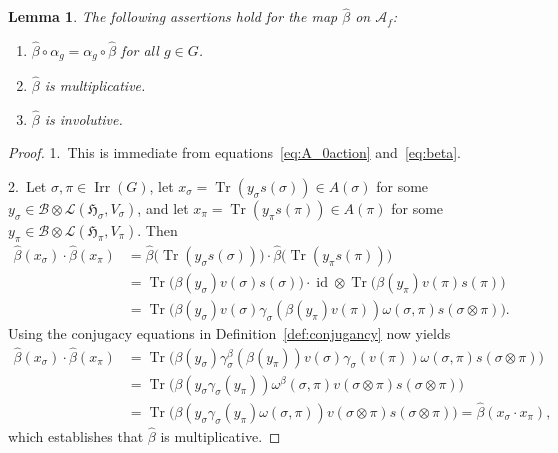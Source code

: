 \documentclass[11pt]{article}
\numberwithin{equation}{section}
\numberwithin{equation}{section}
\newtheorem{Lemma}[Theorem]{Lemma}
\newcommand*{\tensor}{\otimes}		%
\DeclareMathOperator{\id}{id}		%
\DeclareMathOperator{\Tr}{Tr}		%
\newcommand*{\hilb}{\mathfrak}		%
\newcommand*{\alg}{\mathcal}		%
\newcommand*{\hH}{\hilb{H}}			%
\newcommand*{\aA}{\alg{A}}			%
\newcommand*{\aB}{\alg{B}} 			%
\newcommand*{\End}{\mathcal{L}} %
\DeclareMathOperator{\Irrep}{Irr} 			%
\begin{document}
\begin{Lemma}\label{lem:prop_beta}
	The following assertions hold for the map $\hat \beta$ on $\aA_f$:
	\begin{enumerate}\itemsep=0pt
	\item[$1.$]
		$\hat\beta \circ \alpha_g = \alpha_g \circ \hat \beta$ for all $g \in G$.
	\item[$2.$]
		$\hat\beta$ is multiplicative.
	\item[$3.$]
		$\hat\beta$ is involutive.
	\end{enumerate}
\end{Lemma}
\begin{proof}1.~This is immediate from equations~\eqref{eq:A_0action} and~\eqref{eq:beta}.

2.~Let $\sigma, \pi \in \Irrep(G)$, let $x_\sigma = \Tr (y_\sigma s(\sigma)) \in A(\sigma)$ for some $y_\sigma \in \aB \tensor \End(\hH_\sigma, V_\sigma)$, and let $x_\pi = \Tr ( y_\pi s(\pi) ) \in A(\pi)$ for some $y_\pi \in \aB \tensor \End(\hH_\pi, V_\pi)$.
		Then
		\begin{align*}
			\hat\beta(x_\sigma) \cdot \hat\beta(x_\pi)
			&=
			\hat\beta \bigl( \Tr( y_\sigma s(\sigma) ) \bigr)
			\cdot \hat \beta \bigl( \Tr (y_\pi s(\pi) ) \bigr)
			\\
			&=
			\Tr \bigl( \beta(y_\sigma) v(\sigma) s(\sigma) \bigr)
			\cdot \id \tensor \Tr \bigl( \beta(y_\pi) v(\pi) s(\pi) \bigr)
			\\
			&=
			\Tr \bigl( \beta(y_\sigma) v(\sigma) \gamma_\sigma ( \beta(y_\pi) v(\pi) ) \omega(\sigma, \pi) s(\sigma \tensor \pi) \bigr).
		\end{align*}
		Using the conjugacy equations in Definition~\ref{def:conjugancy} now yields
		\begin{align*}
			\hat\beta(x_\sigma) \cdot \hat\beta(x_\pi)
			&=
			\Tr \bigl( \beta(y_\sigma) \gamma^\beta_\sigma ( \beta(y_\pi) ) v(\sigma) \gamma_\sigma ( v(\pi) ) \omega(\sigma, \pi) s(\sigma \tensor \pi) \bigr)
			\\
			&= \Tr \bigl( \beta ( y_\sigma \gamma_\sigma(y_\pi) ) \omega^\beta(\sigma, \pi) v(\sigma \tensor \pi) s(\sigma \tensor \pi) \bigr)
			\\
			&= \Tr \bigl( \beta ( y_\sigma \gamma_\sigma(y_\pi) \omega(\sigma, \pi) ) v(\sigma \tensor \pi) s(\sigma \tensor \pi) \bigr)
			=
			\hat\beta(x_\sigma \cdot x_\pi),
		\end{align*}
		which establishes that $\hat\beta$ is multiplicative.


\end{proof}
\end{document}
